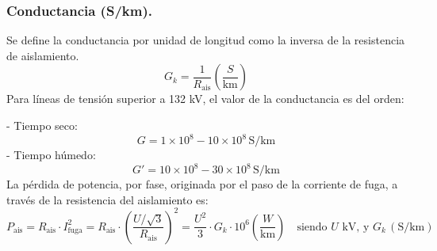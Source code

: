 \documentclass[12pt,a4paper]{article}
\begin{document}
\subsubsection{Conductancia (S/km).}	
Se define la conductancia por unidad de longitud como la inversa de la resistencia de aislamiento.
\[
\boxed{G_k = \frac{1}{R_{\text{ais}}} \left( \frac{S}{\text{km}} \right)}
\]
Para líneas de tensión superior a 132 kV, el valor de la conductancia es del orden:

- Tiempo seco:  
\[
\boxed{G = 1 \times 10^8 - 10 \times 10^8 \, \text{S/km}}
\]
- Tiempo húmedo:  
\[
\boxed{G' = 10 \times 10^8 - 30 \times 10^8 \, \text{S/km}}
\]
La pérdida de potencia, por fase, originada por el paso de la corriente de fuga, a través de la resistencia del aislamiento es:
\[
\boxed{P_{\text{ais}} = R_{\text{ais}} \cdot I_{\text{fuga}}^2 = R_{\text{ais}} \cdot \left( \frac{U/\sqrt{3}}{R_{\text{ais}}} \right)^2 = \frac{U^2}{3} \cdot G_k \cdot 10^6 \left( \frac{W}{\text{km}} \right) \quad \text{siendo } U \text{ kV, y } G_k \, (\text{S/km})}
\]


	
\end{document}

